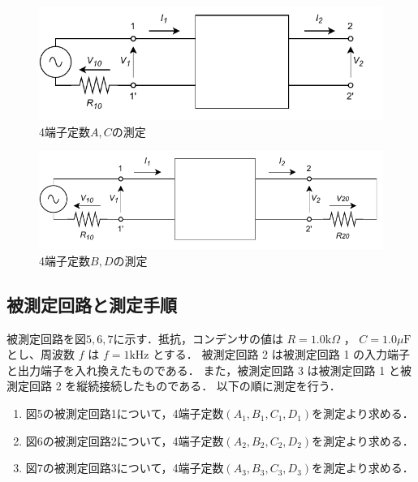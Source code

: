 \begin{figure}[H]
    \begin{center}
        \includegraphics[]{figure3.drawio.pdf}
        \caption{4端子定数$A,C$の測定}
    \end{center}
\end{figure}

\begin{figure}[H]
    \begin{center}
        \includegraphics[]{figure4.drawio.pdf}
        \caption{4端子定数$B,D$の測定}
    \end{center}
\end{figure}


\subsection{被測定回路と測定手順}
被測定回路を図$5,6,7$に示す．抵抗，コンデンサの値は $R=1.0 \mathrm{k} \Omega$ ， $C=1.0 \mu \mathrm{F}$ とし、周波数 $f$ は $f=1 \mathrm{kHz}$ とする．
被測定回路 2 は被測定回路 1 の入力端子と出力端子を入れ換えたものである．
また，被測定回路 3 は被測定回路 1 と被測定回路 2 を縦続接続したものである． 以下の順に測定を行う．

\begin{enumerate}
    \item 図5の被測定回路1について，4端子定数$(A_1, B_1, C_1, D_1)$を測定より求める．
    \item 図6の被測定回路2について，4端子定数$(A_2, B_2, C_2, D_2)$を測定より求める．
    \item 図7の被測定回路3について，4端子定数$(A_3, B_3, C_3, D_3)$を測定より求める．
\end{enumerate}

